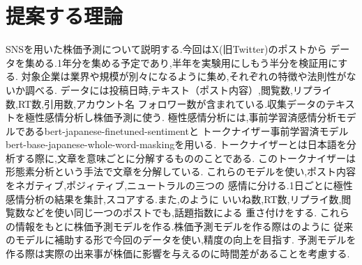 \documentclass[11pt]{jarticle}
\begin{document}
\section{提案する理論}
SNSを用いた株価予測について説明する.今回はX(旧Twitter)のポストから
データを集める.1年分を集める予定であり,半年を実験用にしもう半分を検証用にする.
対象企業は業界や規模が別々になるように集め,それぞれの特徴や法則性がないか調べる.
データには投稿日時,テキスト（ポスト内容）,閲覧数,リプライ数,RT数,引用数,アカウント名
フォロワー数が含まれている.収集データのテキストを極性感情分析し株価予測に使う.
極性感情分析には,事前学習済感情分析モデルであるbert-japanese-finetuned-sentimentと
トークナイザー事前学習済モデルbert-base-japanese-whole-word-maskingを用いる.
トークナイザーとは日本語を分析する際に,文章を意味ごとに分解するもののことである.
このトークナイザーは形態素分析という手法で文章を分解している.
これらのモデルを使い,ポスト内容をネガティブ,ポジィティブ,ニュートラルの三つの
感情に分ける.1日ごとに極性感情分析の結果を集計,スコアする.また,\cite{oikawa}のように
いいね数,RT数,リプライ数,閲覧数などを使い同じ一つのポストでも,話題指数による
重さ付けをする.
これらの情報をもとに株価予測モデルを作る.株価予測モデルを作る際は\cite{posSNS}のように
従来のモデルに補助する形で今回のデータを使い,精度の向上を目指す.
予測モデルを作る際は実際の出来事が株価に影響を与えるのに時間差があることを考慮する.
\end{document}

